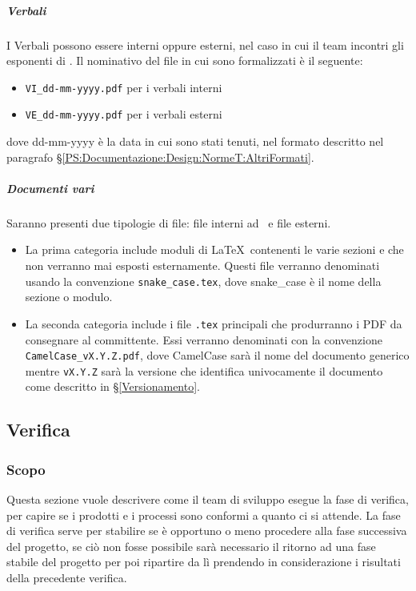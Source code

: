 			\subparagraph{Verbali}	\label{NomenclaturaVerbali}
			I Verbali  possono essere interni oppure esterni, nel caso in cui il team incontri gli esponenti di \II.
			Il nominativo del file in cui sono formalizzati è il seguente:
			\begin{itemize}
				\item \texttt{VI\_dd-mm-yyyy.pdf} per i verbali interni
				\item \texttt{VE\_dd-mm-yyyy.pdf} per i verbali esterni
			\end{itemize}
			dove dd-mm-yyyy è la data in cui sono stati tenuti, nel formato descritto nel paragrafo \S\ref{PS:Documentazione:Design:NormeT:AltriFormati}.

			\subparagraph{Documenti vari}
			Saranno presenti due tipologie di file: file interni ad \gruppo\ e file esterni.
			\begin{itemize}
				\item La prima categoria include moduli di \LaTeX\ contenenti le varie sezioni e che non verranno mai esposti esternamente. Questi file verranno	denominati usando la convenzione \texttt{snake\_case.tex}, dove snake\_case è il nome della sezione o modulo.
				\item La seconda categoria include i file \texttt{.tex} principali che produrranno i PDF da consegnare al committente. Essi verranno denominati con la convenzione \texttt{CamelCase\_vX.Y.Z.pdf}, dove CamelCase sarà il nome del documento generico mentre	\texttt{vX.Y.Z} sarà la versione che identifica univocamente il documento come descritto in \S\ref{Versionamento}.
			\end{itemize}

	\subsection{Verifica}

		\subsubsection{Scopo}
		Questa sezione vuole descrivere come il team di sviluppo esegue la fase di verifica, per capire se i prodotti e i processi sono conformi a quanto ci si attende.
		La fase di verifica serve per stabilire se è opportuno o meno procedere alla fase successiva del progetto, se ciò non fosse possibile sarà necessario il
		ritorno ad una fase stabile del progetto per poi ripartire da lì prendendo in considerazione i risultati della precedente verifica.

